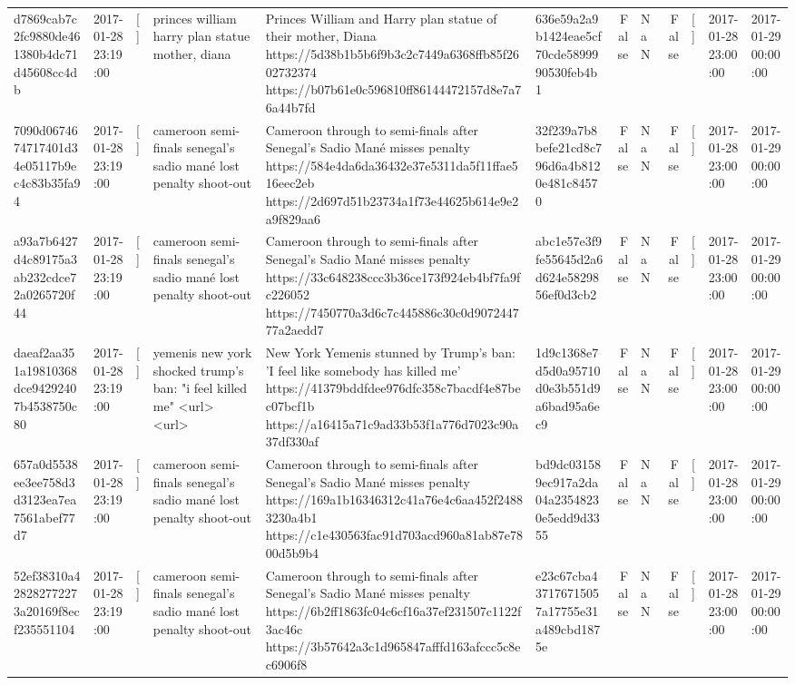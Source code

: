 \begin{tabular}{llllllrlrlll}
d7869cab7c2fc9880de461380b4dc71d45608cc4db & 2017-01-28 23:19:00 & [] & princes william harry plan statue mother, diana & Princes William and Harry plan statue of their mother, Diana https://5d38b1b5b6f9b3c2c7449a6368ffb85f2602732374 https://b07b61e0c596810ff86144472157d8e7a76a44b7fd & 636e59a2a9b1424eae5cf70cde5899990530feb4b1 & False & NaN & False & [] & 2017-01-28 23:00:00 & 2017-01-29 00:00:00 \\
7090d0674674717401d34e05117b9ec4c83b35fa94 & 2017-01-28 23:19:00 & [] & cameroon semi-finals senegal's sadio mané lost penalty shoot-out & Cameroon through to semi-finals after Senegal’s Sadio Mané misses penalty https://584e4da6da36432e37e5311da5f11ffae516eec2eb https://2d697d51b23734a1f73e44625b614e9e2a9f829aa6 & 32f239a7b8befe21cd8c796d6a4b8120e481c84570 & False & NaN & False & [] & 2017-01-28 23:00:00 & 2017-01-29 00:00:00 \\
a93a7b6427d4c89175a3ab232cdce72a0265720f44 & 2017-01-28 23:19:00 & [] & cameroon semi-finals senegal's sadio mané lost penalty shoot-out & Cameroon through to semi-finals after Senegal’s Sadio Mané misses penalty https://33c648238ccc3b36ce173f924eb4bf7fa9fc226052 https://7450770a3d6c7c445886c30c0d907244777a2aedd7 & abc1e57e3f9fe55645d2a6d624e5829856ef0d3cb2 & False & NaN & False & [] & 2017-01-28 23:00:00 & 2017-01-29 00:00:00 \\
daeaf2aa351a19810368dce94292407b4538750c80 & 2017-01-28 23:19:00 & [] & yemenis new york shocked trump's ban: "i feel killed me" <url> <url> & New York Yemenis stunned by Trump's ban: 'I feel like somebody has killed me' https://41379bddfdee976dfc358c7bacdf4e87bec07bcf1b https://a16415a71c9ad33b53f1a776d7023c90a37df330af & 1d9c1368e7d5d0a95710d0e3b551d9a6bad95a6ec9 & False & NaN & False & [] & 2017-01-28 23:00:00 & 2017-01-29 00:00:00 \\
657a0d5538ee3ee758d3d3123ea7ea7561abef77d7 & 2017-01-28 23:19:00 & [] & cameroon semi-finals senegal's sadio mané lost penalty shoot-out & Cameroon through to semi-finals after Senegal’s Sadio Mané misses penalty https://169a1b16346312c41a76e4c6aa452f24883230a4b1 https://c1e430563fac91d703acd960a81ab87e7800d5b9b4 & bd9dc031589ec917a2da04a23548230e5edd9d3355 & False & NaN & False & [] & 2017-01-28 23:00:00 & 2017-01-29 00:00:00 \\
52ef38310a428282772273a20169f8ecf235551104 & 2017-01-28 23:19:00 & [] & cameroon semi-finals senegal's sadio mané lost penalty shoot-out & Cameroon through to semi-finals after Senegal’s Sadio Mané misses penalty https://6b2ff1863fc04c6cf16a37ef231507c1122f3ac46c https://3b57642a3c1d965847afffd163afccc5c8ec6906f8 & e23c67cba437176715057a17755e31a489cbd1875e & False & NaN & False & [] & 2017-01-28 23:00:00 & 2017-01-29 00:00:00 \\

\end{tabular}
